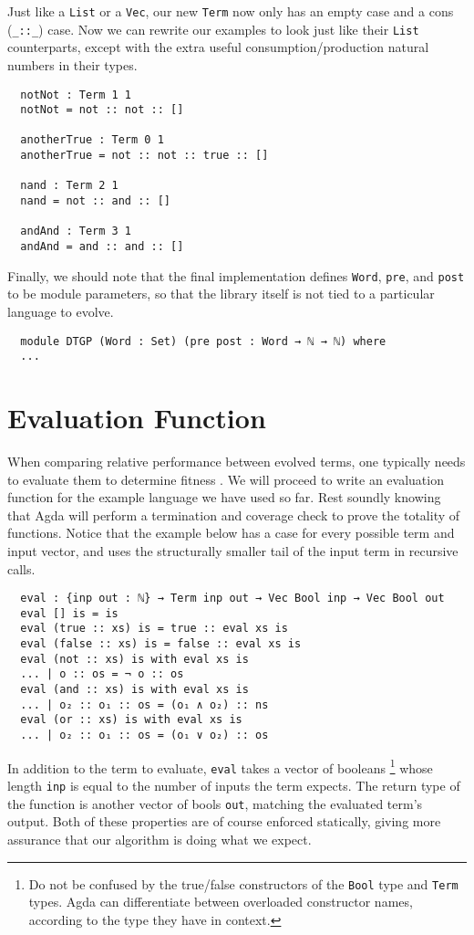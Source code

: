 \documentclass[runningheads,a4paper]{llncs}
\begin{document}
Just like a \texttt{List} or a \texttt{Vec}, our new \texttt{Term} now
only has an empty case and a cons (\texttt{\_::\_}) case. Now we can
rewrite our examples to look just like their \texttt{List}
counterparts, except with the extra useful consumption/production
natural numbers in their types.

\begin{verbatim}
  notNot : Term 1 1
  notNot = not :: not :: []

  anotherTrue : Term 0 1
  anotherTrue = not :: not :: true :: []

  nand : Term 2 1
  nand = not :: and :: []

  andAnd : Term 3 1
  andAnd = and :: and :: []
\end{verbatim}

Finally, we should note that the final implementation defines
\texttt{Word}, \texttt{pre}, and \texttt{post} to be module
parameters, so that the library itself is not tied to a particular
language to evolve.

\begin{verbatim}
  module DTGP (Word : Set) (pre post : Word → ℕ → ℕ) where
  ...
\end{verbatim}

\section{Evaluation Function}

When comparing relative performance between evolved terms, one
typically needs to evaluate them to determine fitness . We will
proceed to write an evaluation function for the example language we
have used so far. Rest soundly knowing that Agda will perform a termination and
coverage check to prove the totality of functions. Notice that the
example below has a case for every possible term and input vector, and
uses the structurally smaller tail of the input term in recursive
calls.

\begin{verbatim}
  eval : {inp out : ℕ} → Term inp out → Vec Bool inp → Vec Bool out
  eval [] is = is
  eval (true :: xs) is = true :: eval xs is
  eval (false :: xs) is = false :: eval xs is
  eval (not :: xs) is with eval xs is
  ... | o :: os = ¬ o :: os
  eval (and :: xs) is with eval xs is
  ... | o₂ :: o₁ :: os = (o₁ ∧ o₂) :: ns
  eval (or :: xs) is with eval xs is
  ... | o₂ :: o₁ :: os = (o₁ ∨ o₂) :: os
\end{verbatim}

In addition to the term to evaluate, \texttt{eval} takes a vector of
booleans \footnote{Do not be confused by the true/false constructors
  of the \texttt{Bool} type and \texttt{Term} types. Agda can
  differentiate between overloaded constructor names, according to the
  type they have in context.}
whose length \texttt{inp} is equal to the number of inputs the
term expects. The return type of the function is another vector of
bools \texttt{out}, matching the evaluated term's output. Both of these
properties are of course enforced statically, giving more assurance that
our algorithm is doing what we expect.
\end{document}
